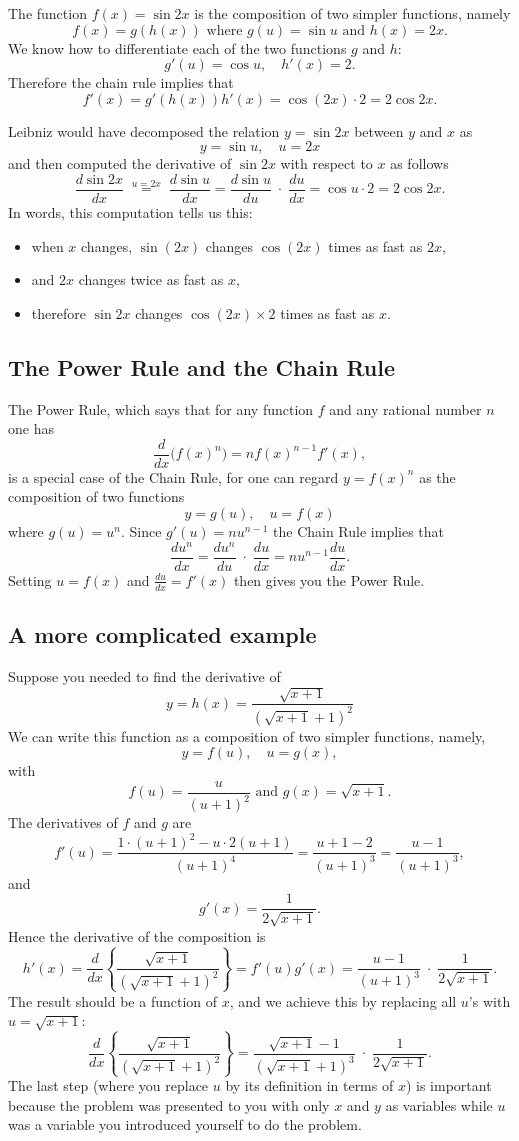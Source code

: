 The function $f(x) = \sin 2x$ is the composition of two simpler
functions, namely
\[
f(x) = g(h(x)) \text{ where }
g(u) = \sin u\text{ and } h(x) = 2x.
\]
We know how to differentiate each of the two functions $g$ and $h$:
\[
g'(u) = \cos u, \quad h'(x) = 2.
\]
Therefore the chain rule implies that 
\[
f'(x) = g'(h(x))h'(x) = \cos(2x)\cdot 2 = 2\cos 2x.
\]

Leibniz would have decomposed the relation $y=\sin 2x$ between $y$ and $x$ as
\[
y=\sin u,\quad u= 2x
\]
and then computed the derivative of $\sin 2x$ with respect to $x$ as follows
\[
\frac{d \sin 2x}{dx} \; \stackrel{u=2x}{=} \; \frac{d\sin u}{dx} 
=\frac{d\sin u}{du} \;\cdot\;\frac{du}{dx} 
=\cos u \cdot 2
=2\cos 2x.
\]
In words, this computation tells us this:  
\begin{itemize}
\item when $x$ changes, $\sin(2x)$ changes $\cos(2x)$ times as fast as $2x$,
\item and $2x$ changes twice as fast as $x$,
\item therefore $\sin 2x$ changes $\cos(2x) \times 2$ times as fast as
  $x$.
\end{itemize}


\subsection{The Power Rule and the Chain Rule}
The Power Rule, which says that for any function $f$ and any rational
number $n$ one has
\[
\frac{d}{dx}\bigl(f(x)^n\bigr) = nf(x)^{n-1}f'(x),
\]
is a special case of the Chain Rule, for one can regard $y=f(x)^n$ as
the composition of two functions
\[
y=g(u), \quad u=f(x)
\]
where $g(u) = u^n$.  Since $g'(u) = nu^{n-1}$ the Chain Rule implies
that
\[
\frac{du^n}{dx} = \frac{du^n}{du}\;\cdot\;\frac{du}{dx}= nu^{n-1}\frac{du}{dx}.
\]
Setting $u=f(x)$ and $\frac{du}{dx} = f'(x)$ then gives you the Power
Rule.

\subsection{A more complicated example}
Suppose you needed to find the derivative of 
\[
y = h(x) = \frac{\sqrt{x+1}}{(\sqrt{x+1}+ 1)^2}
\]
We can write this function as a composition of two simpler functions, namely, 
\[
y=f(u), \quad u=g(x),
\]
with
\[
f(u) = \frac{u}{(u+1)^{2}}
\text{ and } 
g(x) = \sqrt{x+1}.
\]
The derivatives of $f$ and $g$ are
\[
f'(u) = \frac{1\cdot(u+1)^2 - u\cdot 2(u+1)}{(u+1)^4}
=\frac{u+1-2}{(u+1)^3} = \frac{u-1}{(u+1)^{3}},
\]
and
\[
g'(x) = \frac1{2\sqrt{x+1}}.
\]
Hence the derivative of the composition is
\[
h'(x) = \frac{d}{dx}\left\{\frac{\sqrt{x+1}}{(\sqrt{x+1}+ 1)^2}\right\}
=f'(u) g'(x) 
=\frac{u-1}{(u+1)^{3}}\;\cdot\;\frac1{2\sqrt{x+1}}.
\]
The result should be a function of $x$, and we achieve this by
replacing all $u$'s with $u=\sqrt{x+1}$:
\[
\frac{d}{dx}\left\{\frac{\sqrt{x+1}}{(\sqrt{x+1}+ 1)^2}\right\}
=
\frac{\sqrt{x+1}-1}{(\sqrt{x+1}+1)^{3}}\;\cdot\;\frac1{2\sqrt{x+1}}.
\]
The last step (where you replace $u$ by its definition in terms of
$x$) is important because the problem was presented to you with only
$x$ and $y$ as variables while $u$ was a variable you introduced
yourself to do the problem. 

